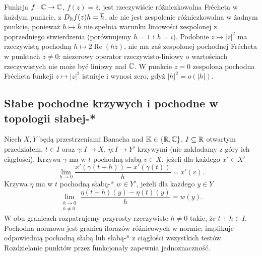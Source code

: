 \begin{przyklad}
\label{ex:complex-nonholomorphic14}
Funkcja $f:\mathbb C\to\mathbb C$, $f(z)=\overline z$, jest rzeczywiście różniczkowalna Frécheta w każdym punkcie, z $D_{\mathbb R}f(z)h=\overline h$, ale nie jest zespolenie różniczkowalna w żadnym punkcie, ponieważ $h\mapsto\overline h$ nie spełnia warunku liniowości zespolonej z poprzedniego stwierdzenia (porównujemy $h=1$ i $h=i$). Podobnie $z\mapsto|z|^2$ ma rzeczywistą pochodną $h\mapsto2\operatorname{Re}(h\overline z)$, nie ma zaś zespolonej pochodnej Frécheta w punktach $z\ne0$: niezerowy operator rzeczywisto-liniowy o wartościach rzeczywistych nie może być liniowy nad $\mathbb C$. W punkcie $z=0$ zespolona pochodna Frécheta funkcji $z\mapsto|z|^2$ istnieje i wynosi zero, gdyż $|h|^2=o(|h|)$.
\end{przyklad}


\subsection{Słabe pochodne krzywych i pochodne w topologii słabej-*}

\begin{definicja}
\label{def:weak-curve-derivative14}
Niech $X,Y$ będą przestrzeniami Banacha nad $\mathbb K\in\{\mathbb R,\mathbb C\}$,
$I\subseteq\mathbb R$ otwartym przedziałem, $t\in I$ oraz
$\gamma:I\to X$, $\eta:I\to Y'$ krzywymi (nie zakładamy
z góry ich ciągłości). Krzywa $\gamma$ ma w $t$ pochodną słabą $v\in X$,
jeżeli dla każdego $x'\in X'$
\[
 \lim_{h\to0}\frac{x'(\gamma(t+h))-x'(\gamma(t))}{h}=x'(v).
\]
Krzywa $\eta$ ma w $t$ pochodną słabą-* $w\in Y'$,
jeżeli dla każdego $y\in Y$
\[
 \lim_{\substack{h\to0\\h\ne0}}
 \frac{\eta(t+h)(y)-\eta(t)(y)}{h}=w(y).
\]
W obu granicach rozpatrujemy przyrosty rzeczywiste $h\ne0$
takie, że $t+h\in I$. Pochodna normowa jest granicą
ilorazów różnicowych w normie; implikuje odpowiednią
pochodną słabą lub słabą-* z ciągłości wszystkich testów.
Rozdzielanie punktów przez funkcjonały zapewnia jednoznaczność.
\end{definicja}

